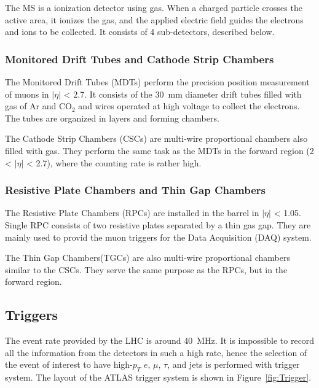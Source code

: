 The MS is a ionization detector using gas. When a charged particle crosses the active area, it ionizes the gas, and the applied electric field guides the electrons and ions to be collected. It consists of 4 sub-detectors, described below.

\subsubsection{Monitored Drift Tubes and Cathode Strip Chambers}
The Monitored Drift Tubes (MDTs) perform the precision position measurement of muons 
in $|\eta|$ < 2.7. It consists of the 30~mm diameter drift tubes filled with gas of Ar and CO$_2$ and wires operated at high voltage to collect the electrons.
The tubes are organized in layers and forming chambers.

The Cathode Strip Chambers (CSCs) are multi-wire proportional chambers also filled with gas. They perform the same task as the MDTs in the forward region (2 < $|\eta|$ < 2.7), where the counting rate is rather high. 

\subsubsection{Resistive Plate Chambers and Thin Gap Chambers}
The Resistive Plate Chambers (RPCs) are installed in the barrel in  $|\eta|$ < 1.05. Single RPC consists of two resistive plates separated by a thin gas gap. They are mainly used to  provid the muon triggers for the Data Acquisition (DAQ) system.

The Thin Gap Chambers(TGCs) are also multi-wire proportional chambers similar to the CSCs. They serve the same purpose as the RPCs, but in the forward region. 

\subsection{Triggers}
The event rate provided by the LHC is around 40~MHz. It is impossible to record all the information from the detectors in such a high rate, hence the selection of the event of interest to have high-$p_T$ $e$, $\mu$, $\tau$, and jets is performed with trigger system. The layout of the ATLAS trigger system is shown in Figure~\ref{fig:Trigger}.

